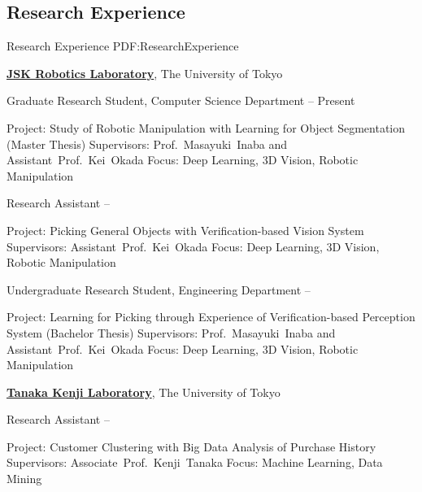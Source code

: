 \documentclass[letterpaper,MMMyyyy,nonstop]{simpleresumecv}
\begin{document}
\begin{body}

\section
{Research Experience}
{Research Experience}
{PDF:ResearchExperience}

\href{http://www.jsk.t.u-tokyo.ac.jp/}
{\textbf{JSK Robotics Laboratory}},
The University of Tokyo

\GapNoBreak
\BulletItem
Graduate Research Student, Computer Science Department
\hfill
{} --
Present
\begin{detail}
\SubBulletItem
Project:
Study of Robotic Manipulation with Learning for Object Segmentation (Master Thesis)
\SubBulletItem
Supervisors:
Prof.~Masayuki~Inaba and Assistant~Prof.~Kei~Okada
\SubBulletItem
Focus:
Deep Learning, 3D Vision, Robotic Manipulation
\end{detail}

\GapNoBreak
\BulletItem
Research Assistant
\hfill
{} --
\begin{detail}
\SubBulletItem
Project:
Picking General Objects with Verification-based Vision System
\SubBulletItem
Supervisors:
Assistant~Prof.~Kei~Okada
\SubBulletItem
Focus:
Deep Learning, 3D Vision, Robotic Manipulation
\end{detail}

\GapNoBreak
\BulletItem
Undergraduate Research Student, Engineering Department
\hfill
{} --
\begin{detail}
\SubBulletItem
Project:
Learning for Picking through Experience of Verification-based Perception System (Bachelor Thesis)
\SubBulletItem
Supervisors:
Prof.~Masayuki~Inaba and Assistant~Prof.~Kei~Okada
\SubBulletItem
Focus:
Deep Learning, 3D Vision, Robotic Manipulation
\end{detail}


\href{http://www.jsk.t.u-tokyo.ac.jp/}
{\textbf{Tanaka Kenji Laboratory}},
The University of Tokyo

\GapNoBreak
\BulletItem
Research Assistant
\hfill
{} --
\begin{detail}
\SubBulletItem
Project:
Customer Clustering with Big Data Analysis of Purchase History
\SubBulletItem
Supervisors:
Associate~Prof.~Kenji~Tanaka
\SubBulletItem
Focus:
Machine Learning, Data Mining
\end{detail}


\end{body}
\end{document}
